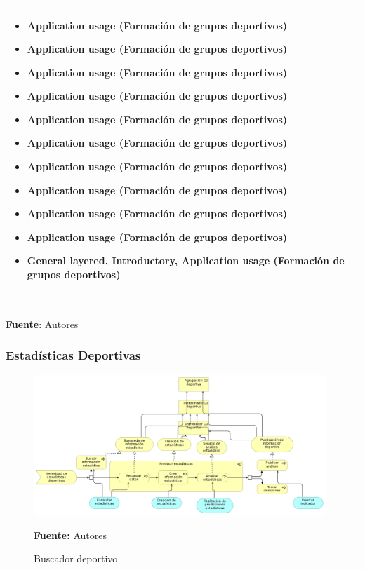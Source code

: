 \begin{table}[!htb]
\begin{center}
{\begin{tabular}{|p{7cm}|p{4cm}|}
\begin{itemize}
				\item Application usage (Formación de grupos deportivos)
				\item Application usage (Formación de grupos deportivos)
				\item Application usage (Formación de grupos deportivos)
				\item Application usage (Formación de grupos deportivos)
				\item Application usage (Formación de grupos deportivos)
				\item Application usage (Formación de grupos deportivos)
				\item Application usage (Formación de grupos deportivos)
				\item Application usage (Formación de grupos deportivos)
				\item Application usage (Formación de grupos deportivos)
				\item Application usage (Formación de grupos deportivos)
				\item General layered, Introductory, Application usage (Formación de grupos deportivos)
			\end{itemize}
			\\
			\hline
		\end{tabular}
		} \\
		\textbf{Fuente}: Autores
	\end{center}
\end{table}

\subsubsection{Estadísticas Deportivas}

\begin{figure}[!htb]
  \begin{center}
    \includegraphics[width=11cm]{./imagenes/business_process/estadisticasdeportivas.png}
    \caption{Buscador deportivo}
    \label{fig:BF_BuscadorDeportivo}
    \textbf{Fuente:}  Autores
  \end{center}
\end{figure}

